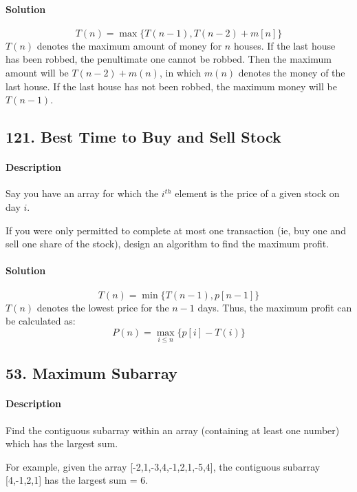 \documentclass{article}
\begin{document}
\paragraph{Solution}

$$T(n)=\max\{T(n-1),T(n-2)+m[n]\}$$
$T(n)$ denotes the maximum amount of money for $n$ houses. If the last house has been robbed, the penultimate one cannot be robbed. Then the maximum amount will be $T(n-2)+m(n)$, in which $m(n)$ denotes the money of the last house. If the last house has not been robbed, the maximum money will be $T(n-1)$.

\subsection{121. Best Time to Buy and Sell Stock}

\paragraph{Description}

Say you have an array for which the $i^{th}$ element is the price of a given stock on day $i$.

If you were only permitted to complete at most one transaction (ie, buy one and sell one share of the stock), design an algorithm to find the maximum profit.

\paragraph{Solution}

$$T(n)=\min\{T(n-1),p[n-1]\}$$
$T(n)$ denotes the lowest price for the $n-1$ days. Thus, the maximum profit can be calculated as:
$$P(n)=\max_{i\leqslant n}\{p[i]-T(i)\}$$

\subsection{53. Maximum Subarray}

\paragraph{Description}

Find the contiguous subarray within an array (containing at least one number) which has the largest sum.

For example, given the array [-2,1,-3,4,-1,2,1,-5,4],
the contiguous subarray [4,-1,2,1] has the largest sum = 6.
\end{document}
